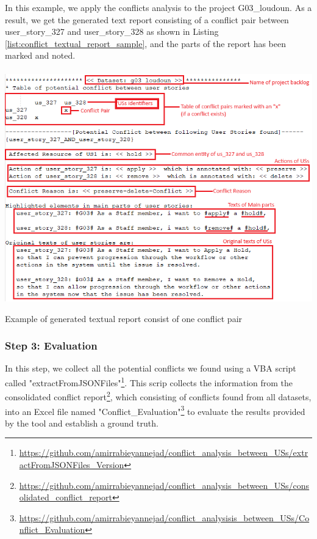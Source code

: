 \begin{example}
In this example, we apply the conflicts analysis to the project G03\_loudoun. As a result, we get the generated text report consisting of a conflict pair between user\_story\_327 and user\_story\_328 as shown in Listing \ref{list:conflict_textual_report_sample}, and the parts of the report has been marked and noted.
\begin{MyListing}
	\paragraph{}
	\centering
	\includegraphics[scale=0.7]{Listing/conflict_textual_report_sample.png}
	\caption{Example of generated textual report consist of one conflict pair}\label{list:conflict_textual_report_sample}
\end{MyListing}
\end{example}
\subsubsection*{Step 3: Evaluation}
In this step, we collect all the potential conflicts we found using a VBA script called "extractFromJSONFiles"\footnote{\href{https://github.com/amirrabieyannejad/conflict_analysis_between_USs/blob/main/00_annotated_datasets/extractFromJSONFiles_Version(new).xlsm}{https://github.com/amirrabieyannejad/conflict\_analysis\_between\_USs/extractFromJSONFiles\_Version}}. This scrip collects the information from the consolidated conflict report\footnote{\href{https://github. com/amirrabieyannejad/conflict_analysis_between_USs/blob/main/00_annotated_datasets/consolidated_conflict_report.json}{https://github.com/amirrabieyannejad/conflict\_analysis\_between\_USs/consolidated\_conflict\_report}}, which consisting of conflicts found from all datasets, into an Excel file named "Conflict\_Evaluation"\footnote{\href{https://github. com/amirrabieyannejad/conflict_analysis_between_USs/blob/main/00_annotated_datasets/Conflict_Evaluation.xlsx}{https://github.com/amirrabieyannejad/conflict\_analysisis\_between\_USs/Conflict\_Evaluation}} to evaluate the results provided by the tool and establish a ground truth.

